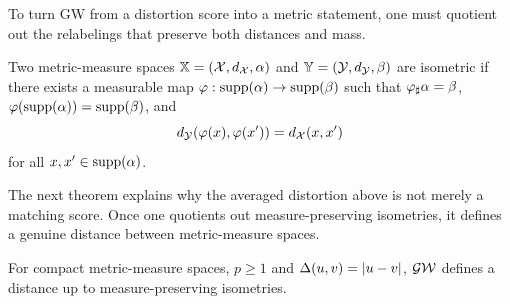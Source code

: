To turn GW from a distortion score into a metric statement, one must quotient out the relabelings that preserve both distances and mass.

\begin{defn}\label{def-isometric-mm-spaces}
	Two metric-measure spaces $\mathbb{X}=(\mathcal{X},d_{\mathcal{X}},\alpha)$ and $\mathbb{Y}=(\mathcal{Y},d_{\mathcal{Y}},\beta)$ are isometric if there exists a measurable map $\varphi:\operatorname{supp}(\alpha)\to\operatorname{supp}(\beta)$ such that $\varphi_\sharp\alpha=\beta$, $\varphi(\operatorname{supp}(\alpha))=\operatorname{supp}(\beta)$, and
	\[
		d_{\mathcal{Y}}(\varphi(x),\varphi(x'))=d_{\mathcal{X}}(x,x')
	\]
	for all $x,x'\in\operatorname{supp}(\alpha)$.
\end{defn}

The next theorem explains why the averaged distortion above is not merely a matching score. Once one quotients out measure-preserving isometries, it defines a genuine distance between metric-measure spaces.

\begin{thm}\label{thm-gw-metric}
	For compact metric-measure spaces, $p\geq1$ and $\Delta(u,v)=|u-v|$, $\operatorname{\mathcal{GW}}$ defines a distance up to measure-preserving isometries.
\end{thm}


